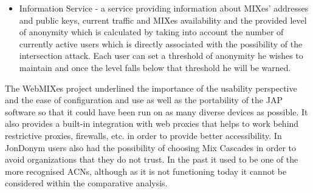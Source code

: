 \begin{itemize}
    \item Information Service - a service providing information about MIXes’ addresses and public keys, current traffic and MIXes availability and the provided level of anonymity which is calculated by taking into account the number of currently active users which is directly associated with the possibility of the intersection attack. Each user can set a threshold of anonymity he wishes to maintain and once the level falls below that threshold he will be warned.
\end{itemize}
The WebMIXes project underlined the importance of the usability perspective and the ease of configuration and use as well as the portability of the JAP software so that it could have been run on as many diverse devices as possible. It also provides a built-in integration with web proxies that helps to work behind restrictive proxies, firewalls, etc. in order to provide better accessibility.
In JonDonym users also had the possibility of choosing Mix Cascades in order to avoid organizations that they do not trust. In the past it used to be one of the more recognised ACNs, although as it is not functioning today it cannot be considered within the comparative analysis.

